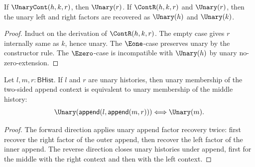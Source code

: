 \begin{lemma}
\label{prop:unary-repetition-continuation-closed}
\label{thm:unary-continuation-closure}
\label{thm:unary-continuation-closure-spine}
If \(\UnaryCont(h,k,r)\), then \(\Unary(r)\). If \(\ContR(h,k,r)\) and \(\Unary(r)\), then the unary left and right factors are recovered as \(\Unary(h)\) and \(\Unary(k)\).
\end{lemma}

\begin{proof}
Induct on the derivation of \(\ContR(h,k,r)\). The empty case gives \(r\) internally same as \(k\), hence unary. The \(\Eone\)-case preserves unary by the constructor rule. The \(\Ezero\)-case is incompatible with \(\Unary(h)\) by unary no-zero-extension.
\end{proof}

\begin{theorem}
\label{thm:unary-append-context-middle-iff}
Let $l,m,r:\mathsf{BHist}$. If $l$ and $r$ are unary histories, then unary
membership of the two-sided append context is equivalent to unary membership
of the middle history:
$$
\Unary(\mathsf{append}(l,\mathsf{append}(m,r)))
\Longleftrightarrow
\Unary(m).
$$
\end{theorem}
\begin{proof}
The forward direction applies unary append factor recovery twice: first recover
the right factor of the outer append, then recover the left factor of the inner
append. The reverse direction closes unary histories under append, first for
the middle with the right context and then with the left context.
\end{proof}

